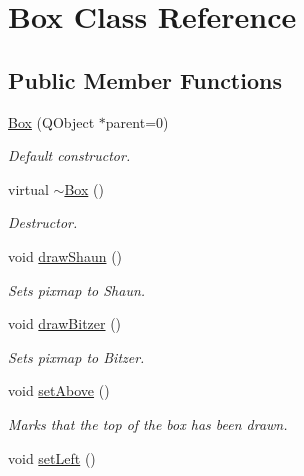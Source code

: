 \hypertarget{classBox}{\section{\-Box \-Class \-Reference}
\label{classBox}
}
\subsection*{\-Public \-Member \-Functions}
\begin{DoxyCompactItemize}
\item 
\hyperlink{classBox_a503cee497e04af238190ba3399c5af31}{\-Box} (\-Q\-Object $\ast$parent=0)
\begin{DoxyCompactList}\small\item\em \-Default constructor. \end{DoxyCompactList}\item 
virtual \hyperlink{classBox_a6a5e09398e85d602a046b429062fb9c2}{$\sim$\-Box} ()
\begin{DoxyCompactList}\small\item\em \-Destructor. \end{DoxyCompactList}\item 
void \hyperlink{classBox_a95cdba384c3ec1a1e449f1e94881c338}{draw\-Shaun} ()
\begin{DoxyCompactList}\small\item\em \-Sets pixmap to \-Shaun. \end{DoxyCompactList}\item 
void \hyperlink{classBox_a0d9638999c98c4b30de81111c198c875}{draw\-Bitzer} ()
\begin{DoxyCompactList}\small\item\em \-Sets pixmap to \-Bitzer. \end{DoxyCompactList}\item 
\hypertarget{classBox_a85433a90ba39dbabc23d1a5fe70eb8cb}{void \hyperlink{classBox_a85433a90ba39dbabc23d1a5fe70eb8cb}{set\-Above} ()}\label{classBox_a85433a90ba39dbabc23d1a5fe70eb8cb}

\begin{DoxyCompactList}\small\item\em \-Marks that the top of the box has been drawn. \end{DoxyCompactList}\item 
\hypertarget{classBox_a64676bbb58aa311da3628830b933641c}{void \hyperlink{classBox_a64676bbb58aa311da3628830b933641c}{set\-Left} ()}\label{classBox_a64676bbb58aa311da3628830b933641c}


\end{DoxyCompactItemize}
